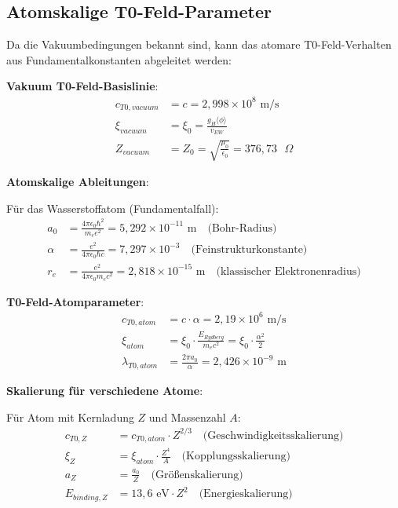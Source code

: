 \documentclass[12pt,a4paper]{article}
\newcommand{\xipar}{\xi}
\begin{document}
	\subsection{Atomskalige T0-Feld-Parameter}
	
	Da die Vakuumbedingungen bekannt sind, kann das atomare T0-Feld-Verhalten aus Fundamentalkonstanten abgeleitet werden:
	
	\textbf{Vakuum T0-Feld-Basislinie}:
	\begin{align}
		c_{T0,vacuum} &= c = 2,998 \times 10^8 \text{ m/s} \\
		\xipar_{vacuum} &= \xipar_0 = \frac{g_H \langle\phi\rangle}{v_{EW}} \\
		Z_{vacuum} &= Z_0 = \sqrt{\frac{\mu_0}{\epsilon_0}} = 376,73 \text{ $\Omega$}
	\end{align}
	
	\textbf{Atomskalige Ableitungen}:
	
	Für das Wasserstoffatom (Fundamentalfall):
	\begin{align}
		a_0 &= \frac{4\pi\epsilon_0\hbar^2}{m_e e^2} = 5,292 \times 10^{-11} \text{ m} \quad \text{(Bohr-Radius)} \\
		\alpha &= \frac{e^2}{4\pi\epsilon_0\hbar c} = 7,297 \times 10^{-3} \quad \text{(Feinstrukturkonstante)} \\
		r_{e} &= \frac{e^2}{4\pi\epsilon_0 m_e c^2} = 2,818 \times 10^{-15} \text{ m} \quad \text{(klassischer Elektronenradius)}
	\end{align}
	
	\textbf{T0-Feld-Atomparameter}:
	\begin{align}
		c_{T0,atom} &= c \cdot \alpha = 2,19 \times 10^6 \text{ m/s} \\
		\xipar_{atom} &= \xipar_0 \cdot \frac{E_{Rydberg}}{m_e c^2} = \xipar_0 \cdot \frac{\alpha^2}{2} \\
		\lambda_{T0,atom} &= \frac{2\pi a_0}{\alpha} = 2,426 \times 10^{-9} \text{ m}
	\end{align}
	
	\textbf{Skalierung für verschiedene Atome}:
	
	Für Atom mit Kernladung $Z$ und Massenzahl $A$:
	\begin{align}
		c_{T0,Z} &= c_{T0,atom} \cdot Z^{2/3} \quad \text{(Geschwindigkeitsskalierung)} \\
		\xipar_{Z} &= \xipar_{atom} \cdot \frac{Z^4}{A} \quad \text{(Kopplungsskalierung)} \\
		a_{Z} &= \frac{a_0}{Z} \quad \text{(Größenskalierung)} \\
		E_{binding,Z} &= 13,6 \text{ eV} \cdot Z^2 \quad \text{(Energieskalierung)}
	\end{align}
	
\end{document}
